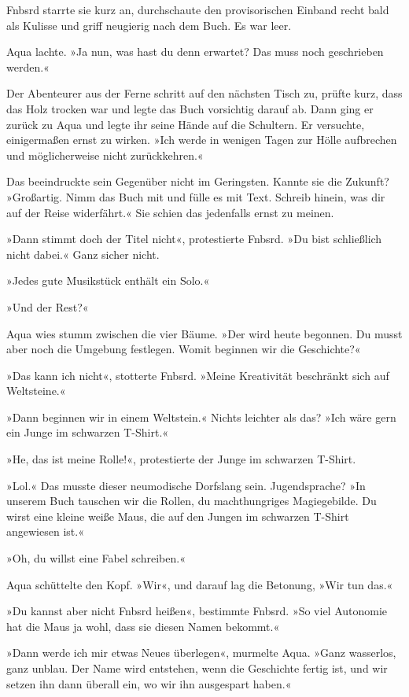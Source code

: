 Fnbsrd starrte sie kurz an, durchschaute den provisorischen Einband recht bald als Kulisse und griff neugierig nach dem Buch. Es war leer.

Aqua lachte. »Ja nun, was hast du denn erwartet? Das muss noch geschrieben werden.«

Der Abenteurer aus der Ferne schritt auf den nächsten Tisch zu, prüfte kurz, dass das Holz trocken war und legte das Buch vorsichtig darauf ab. Dann ging er zurück zu Aqua und legte ihr seine Hände auf die Schultern. Er versuchte, einigermaßen ernst zu wirken. »Ich werde in wenigen Tagen zur Hölle aufbrechen und möglicherweise nicht zurückkehren.«

Das beeindruckte sein Gegenüber nicht im Geringsten. Kannte sie die Zukunft? »Großartig. Nimm das Buch mit und fülle es mit Text. Schreib hinein, was dir auf der Reise widerfährt.« Sie schien das jedenfalls ernst zu meinen.

»Dann stimmt doch der Titel nicht«, protestierte Fnbsrd. »Du bist schließlich nicht dabei.« Ganz sicher nicht.

»Jedes gute Musikstück enthält ein Solo.«

»Und der Rest?«

Aqua wies stumm zwischen die vier Bäume. »Der wird heute begonnen. Du musst aber noch die Umgebung festlegen. Womit beginnen wir die Geschichte?«

»Das kann ich nicht«, stotterte Fnbsrd. »Meine Kreativität beschränkt sich auf Weltsteine.«

»Dann beginnen wir in einem Weltstein.« Nichts leichter als das? »Ich wäre gern ein Junge im schwarzen T-Shirt.«

»He, das ist meine Rolle!«, protestierte der Junge im schwarzen T-Shirt.

»Lol.« Das musste dieser neumodische Dorfslang sein. Jugendsprache? »In unserem Buch tauschen wir die Rollen, du machthungriges Magiegebilde. Du wirst eine kleine weiße Maus, die auf den Jungen im schwarzen T-Shirt angewiesen ist.«

»Oh, du willst eine Fabel schreiben.«

Aqua schüttelte den Kopf. »Wir«, und darauf lag die Betonung, »Wir tun das.«

»Du kannst aber nicht Fnbsrd heißen«, bestimmte Fnbsrd. »So viel Autonomie hat die Maus ja wohl, dass sie diesen Namen bekommt.«

»Dann werde ich mir etwas Neues überlegen«, murmelte Aqua. »Ganz wasserlos, ganz unblau. Der Name wird entstehen, wenn die Geschichte fertig ist, und wir setzen ihn dann überall ein, wo wir ihn ausgespart haben.«

